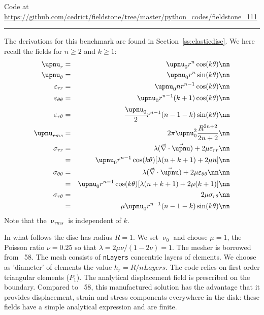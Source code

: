 

\begin{center}
Code at \url{https://github.com/cedrict/fieldstone/tree/master/python_codes/fieldstone_111}
\end{center}

\par\noindent\rule{\textwidth}{0.4pt}


The derivations for this benchmark are found in Section~\ref{ss:elasticdisc}.
We here recall the fields for $n\ge 2$ and $k\ge 1$:
\begin{eqnarray}
\upnu_r          &=& \upnu_0 r^n \cos (k \theta)  \nn \\
\upnu_\theta     &=& \upnu_0 r^n \sin (k \theta)  \nn \\
\varepsilon_{rr} &=&   \upnu_0 n r^{n-1} \cos (k\theta) \nn\\
\varepsilon_{\theta\theta} &=&    \upnu_0 r^{n-1} (k+1) \cos (k\theta) \nn\\
\varepsilon_{r\theta} &=&  \cfrac{\upnu_0}{2}  r^{n-1}  (n-1-k)  \sin (k \theta)  \nn\\
\upnu_{rms}  &=& 2 \pi \upnu_0^2 \frac{R^{2n+2}}{2n+2} \nn\\
\sigma_{rr} 
&=& \lambda (\vec\nabla\cdot \vec\upnu) + 2 \mu \varepsilon_{rr} \nn\\
&=& \upnu_0  r^{n-1}  \cos (k\theta ) [\lambda (n+k+1)+2\mu n]  \nn\\
\sigma_{\theta\theta} 
&=& \lambda (\vec\nabla\cdot \vec\upnu) + 2 \mu \varepsilon_{\theta\theta}\nn  \nn\\
&=& \upnu_0  r^{n-1} \cos (k\theta ) [\lambda(n+k+1) + 2 \mu (k+1) ]  \nn\\
\sigma_{r\theta} 
&=& 2\mu \sigma_{r\theta} \nn\\
&=& \mu \upnu_0  r^{n-1}  (n-1-k)  \sin (k \theta) \nn 
\end{eqnarray}
Note that the $\upnu_{rms}$ is independent of $k$.

In what follows the disc has radius $R=1$. 
We set $\upnu_0$ and choose $\mu=1$, the Poisson ratio $\nu=0.25$ so that 
$\lambda=2\mu\nu/(1-2\nu)=1$.
The mesher is borrowed from \stone~58. The mesh consists of {\tt nLayers} concentric layers of elements.
We choose as 'diameter' of elements the value $h_r=R/nLayers$.
The code relies on first-order triangular elements ($P_1$).
The analytical displacement field is prescribed on the boundary.
Compared to \stone~58, this manufactured solution has the advantage that 
it provides displacement, strain and stress components everywhere in the disk:
these fields have a simple analytical expression and are finite.

